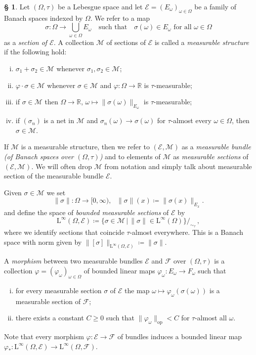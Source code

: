 \documentclass[11pt, oneside]{amsart}
\theoremstyle{definition}
\newtheorem{no}[lemma]{\S}
\theoremstyle{remark}
\theoremstyle{TheoremNum}
\newcommand\calM{{\mathcal M}}
\newcommand\calE{{\mathcal E}}
\newcommand\cF{{\mathcal F}}
\newcommand{\cE}{\mathcal E}
\newcommand{\cM}{\mathcal M}
\newcommand{\Linf}{\mathrm{L}^{\infty}}
\newcommand{\bR}{\mathbb{R}}
\renewcommand{\phi}{\varphi}
\begin{document}
\begin{no}
Let $(\Omega, \tau)$ be a Lebesgue space and let $\calE=(E_\omega)_{\omega\in \Omega}$ be a family of Banach spaces indexed by $\Omega$. We refer to a map
\[
\sigma: \Omega \to \bigcup_{\omega \in \Omega} E_\omega \quad \text{such that} \quad \sigma(\omega) \in E_\omega \text{ for all }\omega \in \Omega
\]
as a \emph{section of $\cE$}. A collection $\calM$ of sections of $\cE$ is called a \emph{measurable structure} if the following hold:
\begin{enumerate}[(i)]
\item$\sigma_1+\sigma_2\in \calM$ whenever $\sigma_1,\sigma_2 \in \calM$;
\item $\varphi \cdot \sigma \in \calM$ whenever $\sigma\in \calM$ and $\varphi: \Omega \to \bR$ is $\tau$-measurable;
\item if $\sigma\in \calM$ then $\Omega \to \bR$, $\omega \mapsto \lVert \sigma(\omega) \rVert_{E_\omega}$ is $\tau$-measurable;
\item if $(\sigma_n)$ is a net in $\calM$ and $\sigma_n(\omega)\rightarrow \sigma(\omega)$ for $\tau$-almost every $\omega\in \Omega$, then $\sigma \in \calM$.
 \end{enumerate} 
If $\cM$ is a measurable structure, then we refer to $(\cE, \cM)$ as a \emph{measurable bundle (of Banach spaces over $(\Omega, \tau)$)} and to elements of $\cM$ as \emph{measurable sections} of $(\cE, \cM)$. We will often drop $\cM$ from notation and simply talk about measurable section of the measurable bundle $\cE$. 

\item Given $\sigma \in \cM$ we set
\[
\lVert \sigma \rVert:  \Omega \rightarrow [0,\infty), \ \ \ \lVert \sigma \rVert(x)\coloneqq \lVert \sigma(x) \rVert_{E_x}. 
\]
and define the space of \emph{bounded measurable sections} of $\cE$ by
\[\Linf(\Omega,\mathcal{E})\coloneqq \{\sigma\in \mathcal{M}\,|\,  \lVert \sigma \rVert \in\Linf(\Omega) \}/_{\sim_{\tau}}\,,\]
where we identify sections that coincide $\tau$-almost everywhere. This is a Banach space with norm given by 
$\|[\sigma]\|_{\Linf(\Omega,\mathcal{E})} \coloneqq \|\sigma\|$.
 
\item A \emph{morphism} between two measurable bundles $\cE$ and $\cF$ over $(\Omega,\tau)$ is a collection $\varphi=(\varphi_\omega)_{\omega\in \Omega}$ of bounded linear maps $\varphi_\omega:E_\omega \rightarrow F_\omega$ such that
\begin{enumerate}[(i)]
\item for every measurable section $\sigma$ of $\cE$ the map  $\omega\mapsto \varphi_\omega(\sigma(\omega)) $ is a measurable section of $\mathcal{F}$;
\item there exists a constant $C \geq 0$ such that $\| \phi_\omega\|_{\mathrm{op}} < C$ for $\tau$-almost all $\omega$.
\end{enumerate}
Note that every morphism $\phi: \cE \to \cF$ of bundles induces a bounded linear map $\phi_*: \Linf(\Omega,\mathcal{E}) \to \Linf(\Omega,\mathcal{F})$.
 \end{no}
\end{document}
